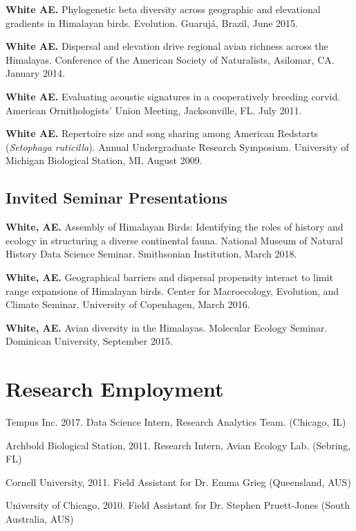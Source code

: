 \documentclass[letterpaper]{article}
\renewenvironment{itemize}{
  \begin{list}{}{
    \setlength{\leftmargin}{1.5em}
  }
}{
  \end{list}
}
\newenvironment{biblist}{%
   \begin{list}{}{%
     \setlength{\labelwidth}{0pt}%
     \setlength{\labelsep}{1em}%
     \setlength{\leftmargin}{2em}%
     \setlength{\itemindent}{-1em}%
   }
}{\end{list}}
\begin{document}
\begin{biblist}
\item \textbf{White AE.} Phylogenetic beta diversity across geographic and elevational gradients in Himalayan birds. Evolution. Guarujá, Brazil, June 2015.

\item \textbf{White AE.} Dispersal and elevation drive regional avian richness across the Himalayas. Conference of the American Society of Naturalists, Asilomar, CA. January 2014.

\item \textbf{White AE.} Evaluating acoustic signatures in a cooperatively breeding corvid. American Ornithologists' Union Meeting, Jacksonville, FL. July 2011.

\item \textbf{White AE.} Repertoire size and song sharing among American Redstarts (\textit{Setophaga ruticilla}). Annual Undergraduate Research Symposium. University of Michigan Biological Station, MI, August 2009.
\end{biblist}

\subsection*{Invited Seminar Presentations}
\begin{biblist}
\item \textbf{White, AE.} Assembly of Himalayan Birds: Identifying the roles of history and ecology in structuring a diverse continental fauna. National Museum of Natural History Data Science Seminar. Smithsonian Institution, March 2018.
\item \textbf{White, AE.} Geographical barriers and dispersal propensity interact to limit range expansions of Himalayan birds. Center for Macroecology, Evolution, and Climate Seminar. University of Copenhagen, March 2016.
\item \textbf{White, AE.} Avian diversity in the Himalayas. Molecular Ecology Seminar. Dominican University, September 2015.
\end{biblist}



\section*{Research Employment}
\begin{itemize}
\item Tempus Inc. 2017. Data Science Intern, Research Analytics Team. (Chicago, IL) 
\item Archbold Biological Station, 2011. Research Intern, Avian Ecology Lab. (Sebring, FL)
\item Cornell University, 2011. Field Assistant for Dr. Emma Grieg (Queensland, AUS)
\item University of Chicago, 2010. Field Assistant for Dr. Stephen Pruett-Jones (South Australia, AUS)
\end{itemize}
\end{document}
